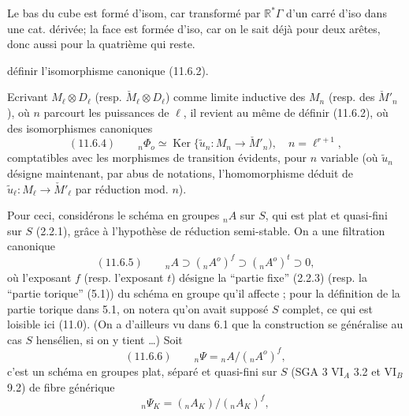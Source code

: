 

Le bas du cube est formé d'isom, car transformé par $\mathbb R^*\Gamma$ d'un carré d'iso dans une cat. dérivée; la face  est formée d'iso, car on le sait déjà pour deux arêtes, donc aussi pour la quatrième qui reste.


définir l'isomorphisme canonique (11.6.2).

Ecrivant $M_\ell\otimes D_\ell$ (resp. $\check M_\ell\otimes D_\ell$) comme limite inductive des $M_n$ (resp. des $\check M'_n$), où $n$ parcourt les puissances de $\ell$, il revient au même de définir (11.6.2), où des isomorphismes canoniques
\[
(11.6.4)\qquad {}_n\Phi_o\simeq\operatorname{Ker}
\{\widetilde u_n:M_n\longrightarrow\check M'_n),\quad n=\ell^{r+1},
\]
comptatibles avec les morphismes de transition évidents, pour $n$ variable
(où $\widetilde u_n$ désigne maintenant, par abus de notations, l'homomorphisme déduit de $\widetilde u_\ell:M_\ell\longrightarrow\check M'_\ell$ par réduction mod. $n$).

Pour ceci, considérons le schéma en groupes $ {}_n A$ sur $S$, qui est plat et quasi-fini sur $S$ (2.2.1), grâce à l'hypothèse de réduction semi-stable. On a une filtration canonique
\[
(11.6.5)\qquad {}_n A\supset({}_n A^o)^f\supset({}_n A^o)^t\supset0,
\]
où l'exposant $f$ (resp. l'exposant $t$) désigne la ``partie fixe'' (2.2.3) (resp. la ``partie torique'' (5.1)) du schéma en groupe qu'il affecte ; pour la définition de la partie torique dans 5.1, on notera qu'on avait supposé $S$ complet, ce qui est loisible ici (11.0). (On a d'ailleurs vu dans 6.1 que la construction se généralise au cas $S$ hensélien, si on y tient \ldots) Soit
\[
(11.6.6)\qquad {}_n\Psi={}_n A/({}_n A^o)^f,
\]
c'est un schéma en groupes plat, séparé et quasi-fini sur $S$ (SGA 3 $\mathrm{VI}_A$ 3.2 et $\mathrm{VI}_B$ 9.2) de fibre générique
\[
{}_n\Psi_K=({}_n A_K)/({}_n A_K)^f,
\]

